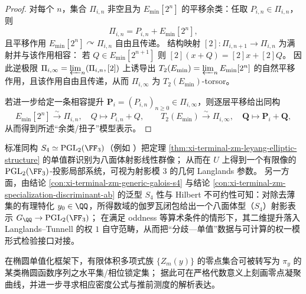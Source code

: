 \begin{proof}
对每个 \(n\)，集合 \(\Pi_{i,n}\) 非空且为 \(E_{\min}[2^n]\) 的平移余类：任取 \(P_{i,n}\in\Pi_{i,n}\)，则
\[
\Pi_{i,n}=P_{i,n}+E_{\min}[2^n],
\]
且平移作用 \(E_{\min}[2^n]\curvearrowright \Pi_{i,n}\) 自由且传递。
结构映射 \([2]:\Pi_{i,n+1}\to\Pi_{i,n}\) 为满射并与该作用相容：
若 \(Q\in E_{\min}[2^{n+1}]\) 则 \([2](x+Q)=[2]x+[2]Q\)。
因此逆极限 \(\Pi_{i,\infty}=\varprojlim_n(\Pi_{i,n},[2])\) 上诱导出 \(T_2(E_{\min})=\varprojlim_n E_{\min}[2^n]\) 的自然平移作用，且该作用自由且传递，从而 \(\Pi_{i,\infty}\) 为 \(T_2(E_{\min})\)-torsor。
\par
若进一步给定一条相容提升 \(\mathbf P_i=(P_{i,n})_{n\ge 0}\in\Pi_{i,\infty}\)，则逐层平移给出同构
\[
E_{\min}[2^n]\stackrel{\sim}{\to}\Pi_{i,n},\quad Q\mapsto P_{i,n}+Q,
\qquad
T_2(E_{\min})\stackrel{\sim}{\to}\Pi_{i,\infty},\quad \mathbf Q\mapsto \mathbf P_i+\mathbf Q,
\]
从而得到所述“余类/扭子”模型表示。
\end{proof}



\par


\begin{remark}\label{rem:xi-terminal-zm-octahedral-mod3-langlands}
标准同构 \(S_4\simeq \mathrm{PGL}_2(\FF_3)\)（例如 \cite{MITSmallGroupsPDF}）把定理 \ref{thm:xi-terminal-zm-leyang-elliptic-structure} 的单值群识别为八面体射影线性群像；
从而在 \(U\) 上得到一个有限像的 \(\mathrm{PGL}_2(\FF_3)\)-投影局部系统，可视为射影模 \(3\) 的几何 Langlands 参数。
另一方面，由结论 \ref{con:xi-terminal-zm-generic-galois-s4} 与结论 \ref{con:xi-terminal-zm-specialization-discriminant-ab} 的泛型 \(S_4\) 性与 Hilbert 不可约性可知：对除去薄集的有理特化 \(y_0\in\QQ\)，所得数域的伽罗瓦闭包给出一个八面体型（\(S_4\)）射影表示 \(G_\QQ\to \mathrm{PGL}_2(\FF_3)\)；
在满足 oddness 等算术条件的情形下，其二维提升落入 Langlands--Tunnell 的权 \(1\) 自守范畴，从而把“分歧—单值”数据与可计算的权一模形式检验接口对接。\cite{Tunnell1981OctahedralArtin,BuzzardPotentialModularitySurvey}
\end{remark}

\begin{remark}[零点凝聚层级的椭圆化入口]\label{rem:xi-terminal-zm-leyang-zero-measure-outlook}
在椭圆单值化框架下，有限体积多项式族 \(\{Z_m(y)\}\) 的零点集合可被转写为 \(\pi_y\) 的某类椭圆函数序列之水平集/相位锁定集；
据此可在严格代数意义上刻画零点凝聚曲线，并进一步寻求相应密度公式与推前测度的解析表达。
\end{remark}




